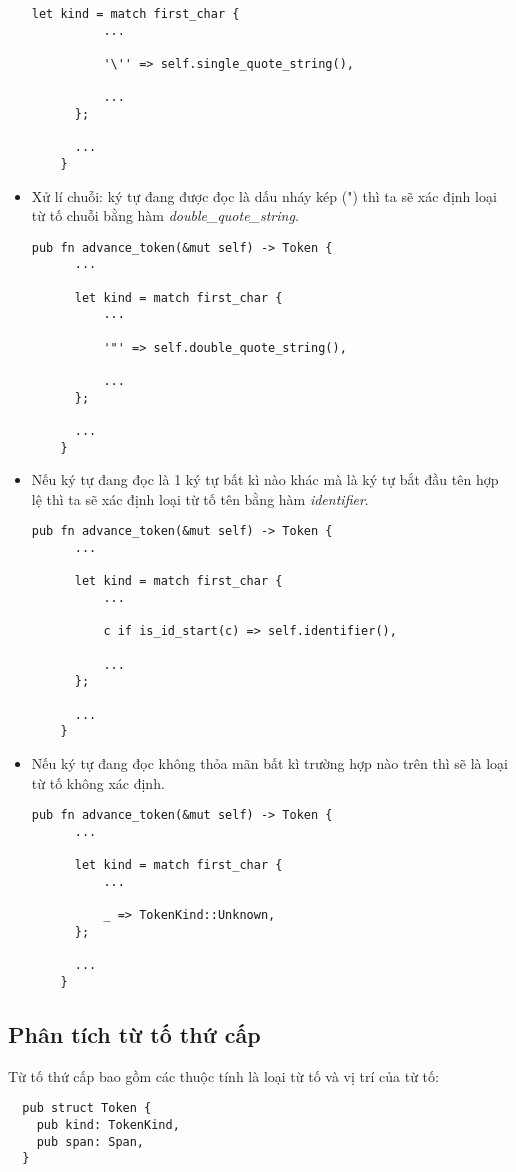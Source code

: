 \begin{itemize}
\begin{lstlisting}[]
      let kind = match first_char {
          ...
  
          '\'' => self.single_quote_string(),
 
          ...
      };
  
      ...
    } 
  \end{lstlisting}
  \item Xử lí chuỗi: ký tự đang được đọc là dấu nháy kép (") thì ta sẽ xác định loại từ tố chuỗi bằng hàm \textit{double\_quote\_string}. 
  \begin{lstlisting}[]
    pub fn advance_token(&mut self) -> Token {
      ...
  
      let kind = match first_char {
          ...
  
          '"' => self.double_quote_string(),
  
          ...
      };
  
      ...
    } 
  \end{lstlisting}
  \item Nếu ký tự đang đọc là 1 ký tự bất kì nào khác mà là ký tự bắt đầu tên hợp lệ thì ta sẽ xác định loại từ tố tên bằng hàm \textit{identifier}. 
  \begin{lstlisting}[]
    pub fn advance_token(&mut self) -> Token {
      ...
  
      let kind = match first_char {
          ...
  
          c if is_id_start(c) => self.identifier(),
  
          ...
      };
  
      ...
    } 
  \end{lstlisting}
  \item Nếu ký tự đang đọc không thỏa mãn bất kì trường hợp nào trên thì sẽ là loại từ tố không xác định.
  \begin{lstlisting}[]
    pub fn advance_token(&mut self) -> Token {
      ...
  
      let kind = match first_char {
          ...
  
          _ => TokenKind::Unknown,
      };
  
      ...
    } 
  \end{lstlisting}
\end{itemize}

\subsection{Phân tích từ tố thứ cấp}

Từ tố thứ cấp bao gồm các thuộc tính là loại từ tố và vị trí của từ tố:
\begin{lstlisting}
  pub struct Token {
    pub kind: TokenKind,
    pub span: Span,
  }
\end{lstlisting}

